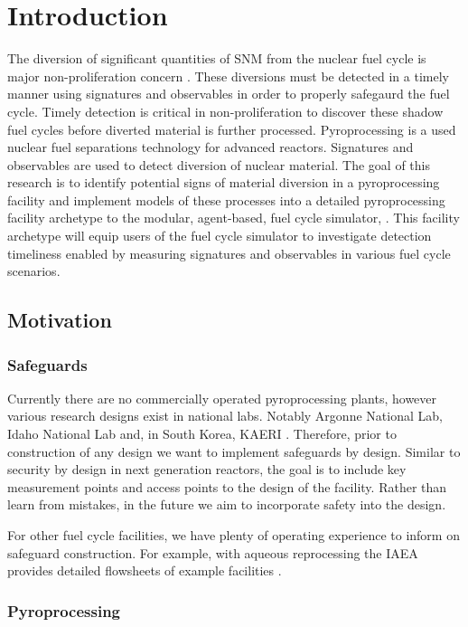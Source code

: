 \chapter[Introduction]{Introduction}
The diversion of significant quantities of \gls{SNM} from the nuclear fuel cycle is major non-proliferation 
concern \cite{noauthor_serving_2017}. These diversions must be detected in a timely manner using signatures and observables in 
order to properly safegaurd the fuel cycle. Timely detection is critical in non-proliferation to discover these shadow fuel cycles
before diverted material is further processed. Pyroprocessing is a used nuclear fuel separations technology for advanced reactors. 
Signatures and observables are used to detect diversion of nuclear material.
The goal of this research is to identify potential signs of material diversion in a pyroprocessing facility and implement models 
of these processes into a detailed pyroprocessing facility archetype to the modular, agent-based, fuel cycle simulator, \Cyclus \cite{huff_fundamental_2016}. This facility archetype will equip users of the \Cyclus fuel cycle simulator to investigate 
detection timeliness enabled by measuring signatures and observables in various fuel cycle scenarios.
\section{Motivation}
\subsection{Safeguards}
Currently there are no commercially operated pyroprocessing plants, however various research designs exist in national labs.
Notably Argonne National Lab, Idaho National Lab and, in South Korea, KAERI \cite{michael_f._simpson_developments_2012, lee_advanced, frigo_conceptual_2003}. 
Therefore, prior to construction of any design we 
want to implement safeguards by design. Similar to security by design in next generation reactors, the goal is to include key measurement 
points and access points to the design of the facility. Rather than learn from mistakes, in the future we aim to incorporate safety 
into the design.

For other fuel cycle facilities, we have plenty of operating experience to inform on safeguard construction. For example, with aqueous reprocessing
the IAEA provides detailed flowsheets of example facilities \cite{international_atomic_energy_agency_implications_2004}.


\subsection{Pyroprocessing}

